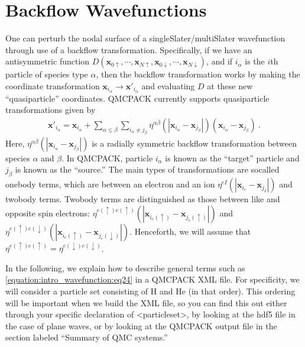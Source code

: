 \documentclass[letterpaper,10pt,english]{sphinxmanual}
\begin{document}
\section{Backflow Wavefunctions}
\label{\detokenize{intro_wavefunction:backflow-wavefunctions}}\label{\detokenize{intro_wavefunction:backflow}}
One can perturb the nodal surface of a single\sphinxhyphen{}Slater/multi\sphinxhyphen{}Slater
wavefunction through use of a backflow transformation. Specifically, if
we have an antisymmetric function
\(D(\mathbf{x}_{0\uparrow},\cdots,\mathbf{x}_{N\uparrow}, \mathbf{x}_{0\downarrow},\cdots,\mathbf{x}_{N\downarrow})\),
and if \(i_\alpha\) is the \(i\)\sphinxhyphen{}th particle of species type
\(\alpha\), then the backflow transformation works by making the
coordinate transformation
\(\mathbf{x}_{i_\alpha} \to \mathbf{x}'_{i_\alpha}\) and evaluating
\(D\) at these new “quasiparticle” coordinates. QMCPACK currently
supports quasiparticle transformations given by
\begin{equation}\label{equation:intro_wavefunction:eq24}
\begin{split}\mathbf{x}'_{i_\alpha}=\mathbf{x}_{i_\alpha}+\sum_{\alpha \leq \beta} \sum_{i_\alpha \neq j_\beta} \eta^{\alpha\beta}(|\mathbf{x}_{i_\alpha}-\mathbf{x}_{j_\beta}|)(\mathbf{x}_{i_\alpha}-\mathbf{x}_{j_\beta})\:.\end{split}
\end{equation}
Here, \(\eta^{\alpha\beta}(|\mathbf{x}_{i_\alpha}-\mathbf{x}_{j_\beta}|)\)
is a radially symmetric backflow transformation between species
\(\alpha\) and \(\beta\). In QMCPACK, particle \(i_\alpha\)
is known as the “target” particle and \(j_\beta\) is known as the
“source.” The main types of transformations are so\sphinxhyphen{}called one\sphinxhyphen{}body
terms, which are between an electron and an ion
\(\eta^{eI}(|\mathbf{x}_{i_e}-\mathbf{x}_{j_I}|)\) and two\sphinxhyphen{}body
terms. Two\sphinxhyphen{}body terms are distinguished as those between like and
opposite spin electrons:
\(\eta^{e(\uparrow)e(\uparrow)}(|\mathbf{x}_{i_e(\uparrow)}-\mathbf{x}_{j_e(\uparrow)}|)\)
and
\(\eta^{e(\uparrow)e(\downarrow)}(|\mathbf{x}_{i_e(\uparrow)}-\mathbf{x}_{j_e(\downarrow)}|)\).
Henceforth, we will assume that
\(\eta^{e(\uparrow)e(\uparrow)}=\eta^{e(\downarrow)e(\downarrow)}\).

In the following, we explain how to describe general terms such as
\eqref{equation:intro_wavefunction:eq24} in a QMCPACK XML file. For specificity, we will
consider a particle set consisting of H and He (in that order). This
ordering will be important when we build the XML file, so you can find
this out either through your specific declaration of \textless{}particleset\textgreater{}, by
looking at the hdf5 file in the case of plane waves, or by looking at
the QMCPACK output file in the section labeled “Summary of QMC systems.”
\end{document}
